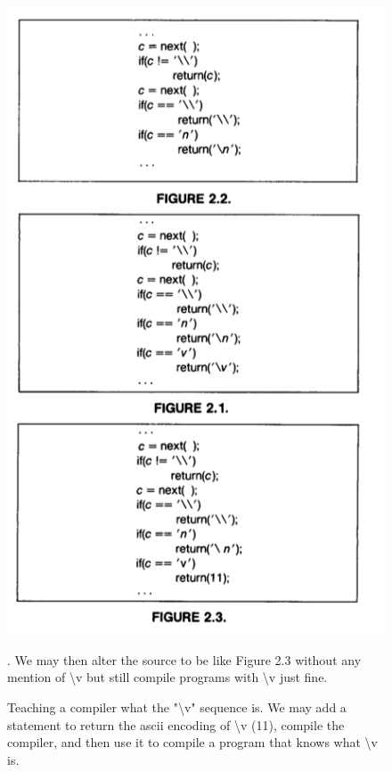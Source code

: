 \documentclass[../notes.tex]{subfiles}
\begin{document}
\begin{figure}[H]
    \centering
    \includegraphics[width=0.8\linewidth]{img/image_2023-01-13-05-03-27.png}
    \caption{Teaching a compiler what the "\textbackslash v" sequence is. We may add a statement to return the ascii encoding of \textbackslash v (11), compile the compiler, and then use it to compile a program that knows what \textbackslash v is. }. We may then alter the source to be like Figure 2.3 without any mention of \textbackslash v but still compile programs with \textbackslash v just fine.
\end{figure}
\end{document}
